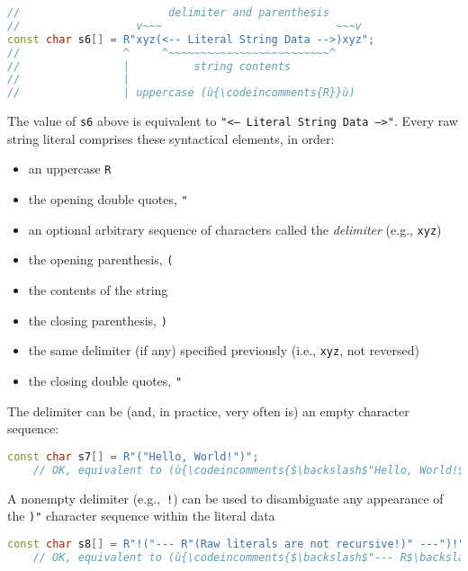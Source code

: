 \begin{lstlisting}[language=C++]
//                       delimiter and parenthesis
//                  v~~~                           ~~~v
const char s6[] = R"xyz(<-- Literal String Data -->)xyz";
//                ^     ^~~~~~~~~~~~~~~~~~~~~~~~~~^
//                |          string contents
//                |
//                | uppercase (ù{\codeincomments{R}}ù)
\end{lstlisting}

\noindent The value of \texttt{s6} above is equivalent to
\texttt{"<--}~\texttt{Literal}~\texttt{String}~\texttt{Data}~\texttt{-->"}.
Every raw string literal comprises these syntactical elements, in order:
\begin{itemize}
\item{an uppercase \texttt{R}}
\item{the opening double quotes, \texttt{"}}
\item{an optional arbitrary sequence of characters called the \emph{delimiter} (e.g., \texttt{xyz})}
\item{the opening parenthesis, \texttt{(}}
\item{the contents of the string}
\item{the closing parenthesis, \texttt{)}}
\item{the same delimiter (if any) specified previously (i.e., \texttt{xyz}, not reversed)}
\item{the closing double quotes, \texttt{"}}
\end{itemize}

The delimiter can be (and, in practice, very often is) an empty character
sequence:

\begin{lstlisting}[language=C++]
const char s7[] = R"("Hello, World!")";
    // OK, equivalent to (ù{\codeincomments{$\backslash$"Hello, World!$\backslash$"}}ù)
\end{lstlisting}

\noindent A nonempty delimiter (e.g.,~\texttt{!}) can be used to disambiguate any
appearance of the \texttt{)"} character sequence within the literal data

\begin{lstlisting}[language=C++]
const char s8[] = R"!("--- R"(Raw literals are not recursive!)" ---")!";
    // OK, equivalent to (ù{\codeincomments{$\backslash$"--- R$\backslash$"(Raw literals are not recursive!)$\backslash$" ---$\backslash$"}}ù)
\end{lstlisting}

